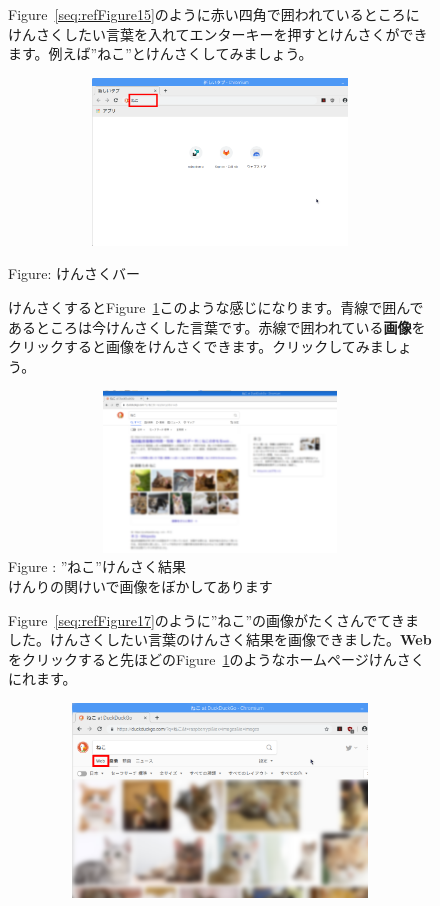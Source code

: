 \documentclass[a4paper,12pt]{jarticle}
\begin{document}
\begin{figure}
  Figure~\ref{seq:refFigure15}のように赤い四角で囲われているところにけんさくしたい言葉を入れてエンターキーを押すとけんさくができます。例えば”ねこ”とけんさくしてみましょう。
  \centering
  {\upshape
    \includegraphics[width=12.023cm,height=4.447cm]{textbook-img077.png}

    Figure{\theFigure\label{seq:refFigure15}}: けんさくバー}


  \flushleft
  けんさくするとFigure~\ref{seq:refFigure16}このような感じになります。青線で囲んであるところは今けんさくした言葉です。赤線で囲われている\textbf{画像}をクリックすると画像をけんさくできます。クリックしてみましょう。


  \centering
  {\upshape
    \includegraphics[width=12.123cm,height=4.299cm]{textbook-img078.png}
    \newline
    Figure {\theFigure\label{seq:refFigure16}}:
    ”ねこ”けんさく結果\\
    けんりの関けいで画像をぼかしてあります}

  \flushleft
  Figure~\ref{seq:refFigure17}のように”ねこ”の画像がたくさんでてきました。けんさくしたい言葉のけんさく結果を画像できました。\textbf{Web}をクリックすると先ほどのFigure~\ref{seq:refFigure16}のようなホームページけんさくにれます。


  \centering
  \begin{minipage}{13.762cm}
    \includegraphics[width=13.892cm,height=5.156cm]{textbook-img079.png}


\end{minipage}
\end{figure}
\end{document}
